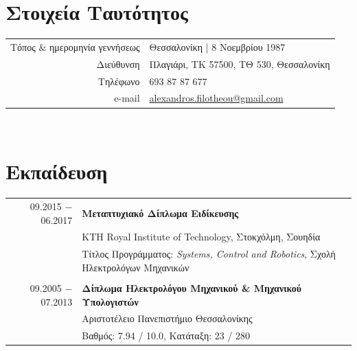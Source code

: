 \documentclass[a4paper,10pt,twoside]{article}
\begin{document}


\par{\bigskip\par}

\section{Στοιχεία Ταυτότητος}

\begin{tabular}{rp{10cm}}
Τόπος $\&$ ημερομηνία γεννήσεως 	& Θεσσαλονίκη | 8 Νοεμβρίου 1987 \\
Διεύθυνση           			        & Πλαγιάρι, ΤΚ 57500, ΤΘ 530, Θεσσαλονίκη \\
Τηλέφωνο                          &  693 87 87 677 \\
e-mail                            & \href{mailto:alexandros.filotheou@gmail.com}{alexandros.filotheou@gmail.com}
\end{tabular}\\


\section{Εκπαίδευση}

\begin{tabular}{rp{11cm}}
09.2015 $-$ 06.2017 & \textbf{Μεταπτυχιακό Δίπλωμα Ειδίκευσης} \\
                    & KTH Royal Institute of Technology, Στοκχόλμη, Σουηδία\\
                    & Τίτλος Προγράμματος: \textit{Systems, Control and Robotics}, Σχολή Ηλεκτρολόγων Μηχανικών\\

&\\
09.2005 $-$ 07.2013 & \textbf{Δίπλωμα Ηλεκτρολόγου Μηχανικού \& Μηχανικού Υπολογιστών} \\
                    & Αριστοτέλειο Πανεπιστήμιο Θεσσαλονίκης \\
                    & Βαθμός: 7.94 / 10.0, Κατάταξη: 23 / 280
\end{tabular}\\
\end{document}
